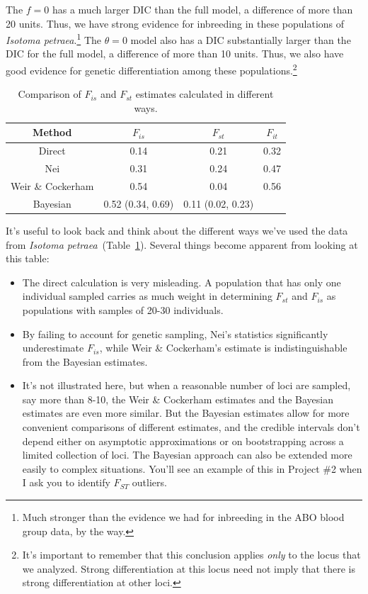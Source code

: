 The $f=0$ has a much larger DIC than the full model, a difference of
more than 20 units. Thus, we have strong evidence for inbreeding in
these populations of {\it Isotoma petraea}.\footnote{Much stronger
  than the evidence we had for inbreeding in the ABO blood group data,
  by the way.} The $\theta = 0$ model also has a DIC substantially
larger than the DIC for the full model, a difference of more than 10
units. Thus, we also have good evidence for genetic differentiation
among these populations.\footnote{It's important to remember that this
  conclusion applies {\it only\/} to the locus that we
  analyzed. Strong differentiation at this locus need not imply that
  there is strong differentiation at other loci.}

\begin{table}
\begin{center}
\begin{tabular}{c|ccc}
\hline\hline
Method & $F_{is}$ & $F_{st}$ & $F_{it}$ \\
\hline
Direct            & 0.14 & 0.21 & 0.32 \\
Nei               & 0.31 & 0.24 & 0.47 \\
Weir \& Cockerham & 0.54 & 0.04 & 0.56 \\
Bayesian          & 0.52 (0.34, 0.69) & 0.11 (0.02, 0.23) \\
\hline
\end{tabular}
\end{center}
\caption{Comparison of $F_{is}$ and $F_{st}$ estimates calculated in
  different ways.}\label{table:compare}
\end{table}

It's useful to look back and think about the different ways we've used
the data from {\it Isotoma
  petraea}~(Table~\ref{table:compare}). Several things become apparent
from looking at this table:

\begin{itemize}

\item The direct calculation is very misleading. A population that
  has only one individual sampled carries as much weight in
  determining $F_{st}$ and $F_{is}$ as populations with samples of
  20-30 individuals.

\item By failing to account for genetic sampling, Nei's statistics
  significantly underestimate $F_{is}$, while Weir \& Cockerham's
  estimate is indistinguishable from the Bayesian estimates.

\item It's not illustrated here, but when a reasonable number of loci
  are sampled, say more than 8-10, the Weir \& Cockerham estimates and
  the Bayesian estimates are even more similar. But the Bayesian estimates
  allow for more convenient comparisons of different estimates, and
  the credible intervals don't depend either on asymptotic
  approximations or on bootstrapping across a limited collection of
  loci. The Bayesian approach can also be extended more easily to
  complex situations. You'll see an example of this in Project \#2
  when I ask you to identify $F_{ST}$ outliers.

\end{itemize}

